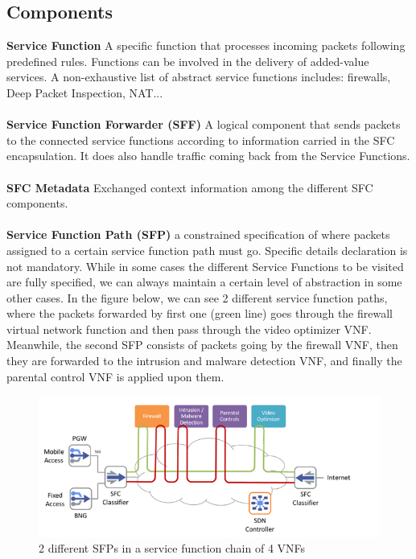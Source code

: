 \subsection{Components}
\vspace*{0.5cm}
\textbf{Service Function} A specific function that processes incoming packets following predefined rules. Functions can be involved in the delivery of added-value services. A non-exhaustive list of abstract service functions includes: firewalls, Deep Packet Inspection, NAT...\\
\\
\textbf{Service Function Forwarder (SFF)} A logical component that sends packets to the connected service functions according to information carried in the SFC encapsulation. It does also handle traffic coming back from the Service Functions.\\ 
\\
\textbf{SFC Metadata} Exchanged context information among the different SFC components.\\
\\
\textbf{Service Function Path (SFP)} a constrained specification of where packets assigned to a certain service function path must go. Specific details declaration is not mandatory. While in some cases the different Service Functions to be visited are fully specified, we can always maintain a certain level of abstraction in some other cases. In the figure below, we can see 2 different service function paths, where the packets forwarded by first one (green line) goes through the firewall virtual network function and then pass through the video optimizer VNF. Meanwhile, the second SFP consists of packets going by the firewall VNF, then  they are forwarded to the intrusion and malware detection VNF, and finally the parental control VNF is applied upon them.
\newpage
\begin{figure}[htp]
    \includegraphics[scale=0.72]{sfp}
    \hspace*{-2cm}
    \caption{2 different SFPs in a service function chain of 4 VNFs }
\end{figure}
